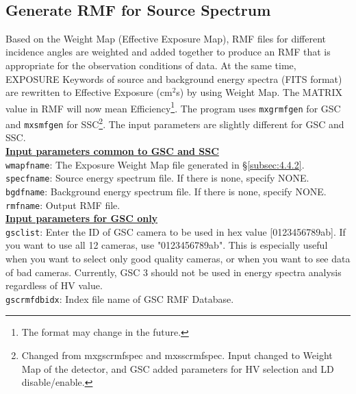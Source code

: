 \documentclass[10pt]{report}
\renewcommand{\_}{\textscale{.5}{\textbf{\textunderscore}}}
\begin{document}
\

\subsection{Generate RMF for Source Spectrum}\label{subsec:4.4.3}

Based on the Weight Map (Effective Exposure Map), RMF files for different incidence angles are weighted and added together to produce an RMF that is appropriate for the observation conditions of data. At the same time, EXPOSURE Keywords of source and background energy spectra (FITS format) are rewritten to Effective Exposure (cm$^2$s) by using Weight Map. The MATRIX value in RMF will now mean Efficiency\footnote{The format may change in the future.}. The program uses \texttt{mxgrmfgen} for GSC and \texttt{mxsmfgen} for SSC\footnote{Changed from mxgscrmfspec and mxsscrmfspec. Input changed to Weight Map of the detector, and GSC added parameters for HV selection and LD disable/enable.}. The input parameters are slightly different for GSC and SSC. \\

\noindent\underline{\textbf{Input parameters common to GSC and SSC}} \\

\noindent\texttt{wmapfname}: The Exposure Weight Map file generated in \S\ref{subsec:4.4.2}. \\

\noindent\texttt{specfname}: Source energy spectrum file. If there is none, specify NONE. \\

\noindent\texttt{bgdfname}: Background energy spectrum file. If there is none, specify NONE. \\

\noindent\texttt{rmfname}: Output RMF file. \\

\noindent\underline{\textbf{Input parameters for GSC only}} \\

\noindent\texttt{gsclist}: Enter the ID of GSC camera to be used in hex value [0123456789ab]. If you want to use all 12 cameras, use "0123456789ab". This is especially useful when you want to select only good quality cameras, or when you want to see data of bad cameras. Currently, GSC 3 should not be used in energy spectra analysis regardless of HV value. \\

\noindent\texttt{gscrmfdbidx}: Index file name of GSC RMF Database. \\
\end{document}
